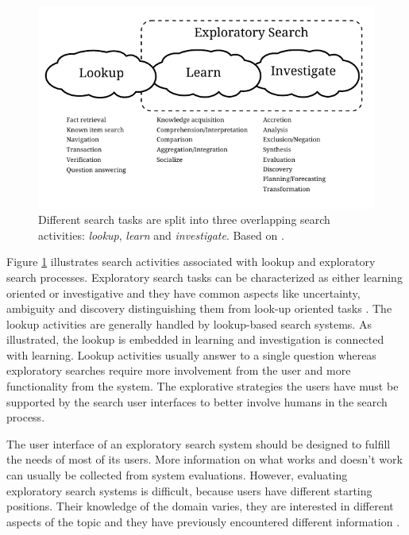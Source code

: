 \begin{figure}[htp] %
\caption{Different search tasks are split into three overlapping search activities: \textit{lookup}, \textit{learn} and \textit{investigate}. Based on \protect\cite{march06}.}
\label{figure_3clouds}
\centering
\includegraphics[scale=0.8]{figures/3clouds2.pdf}
\end{figure}

Figure \ref{figure_3clouds} illustrates search activities associated with lookup and exploratory search processes.
Exploratory search tasks can be characterized as either learning oriented or investigative  and they have common aspects like uncertainty, ambiguity and discovery distinguishing them from look-up oriented tasks \cite{kules09}.
The lookup activities are generally handled by lookup-based search systems.
As illustrated, the lookup is embedded in learning and investigation is connected with learning.
Lookup activities usually answer to a single question whereas exploratory searches require more involvement from the user and more functionality from the system.
The explorative strategies the users have must be supported by the search user interfaces to better involve humans in the search process.

The user interface of an exploratory search system should be designed to fulfill the needs of most of its users.
More information on what works and doesn't work can usually be collected from system evaluations.
However, evaluating exploratory search systems is difficult, because users have different starting positions.
Their knowledge of the domain varies, they are interested in different aspects of the topic and they have previously encountered different information \cite{kules08}.

